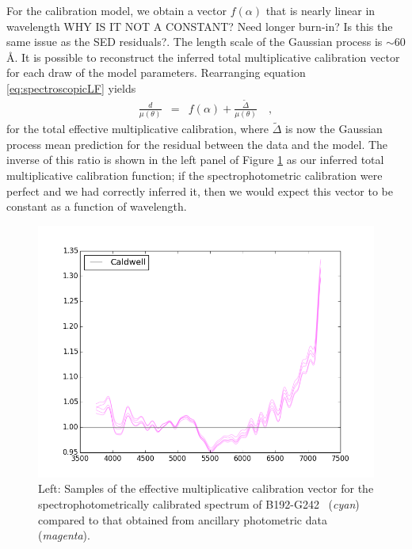 \documentclass[iop,numberedappendix]{emulateapj}
\newcommand{\excluster}{B192-G242}
\begin{document}
For the calibration model, we obtain a vector $f(\alpha)$
that is nearly linear in wavelength {\color{red} WHY IS IT NOT A
CONSTANT?  Need longer burn-in?  Is this the same issue as the SED
residuals?}.  The length scale of the Gaussian process is $\sim
60$\AA.  It is possible to reconstruct the inferred total
multiplicative calibration vector for each draw of the model
parameters.  Rearranging equation \ref{eq:spectroscopicLF} yields
\begin{eqnarray} 
\frac{d}{\mu(\theta)} & = & f(\alpha) +
\frac{\tilde{\Delta}}{\mu(\theta)}
\quad ,
\end{eqnarray}
for the total effective multiplicative calibration, where
$\tilde{\Delta}$ is now the Gaussian process mean prediction for the
residual between the data and the model. The inverse of this ratio is
shown in the left panel of Figure \ref{fig:inferred_calib} as our
inferred total multiplicative calibration function; if the
spectrophotometric calibration were perfect and we had correctly
inferred it, then we would expect this vector to be constant as a
function of wavelength.


\begin{figure}[h!]
\includegraphics[width=\textwidth]{figures/cfig_b192-g242_225.png}
\caption{Left: Samples of the effective multiplicative calibration
vector for the spectrophotometrically calibrated spectrum of
\excluster~ ({\it cyan}) compared to that obtained from ancillary
photometric data ({\it magenta}).  
 \label{fig:inferred_calib}}
\end{figure}
\end{document}
